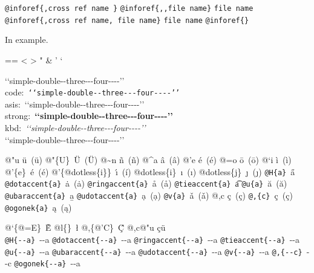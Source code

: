 \documentclass{book}
\makeatletter
\newcommand\Texinfocommandstyletextkbd[1]{{\ttfamily\textsl{#1}}}%
\newenvironment{Texinfopreformatted}{%
  \par\GNUTobeylines\obeyspaces\frenchspacing\parskip=\z@\parindent=\z@}{}
{\catcode`\^^M=13 \gdef\GNUTobeylines{\catcode`\^^M=13 \def^^M{\null\par}}}
\newenvironment{Texinfoindented}{\begin{list}{}{}\item\relax}{\end{list}}
\renewcommand{\_}{\Texinfounderscore\discretionary{}{}{}}
\makeatother
\begin{document}
\texttt{@inforef\{,cross ref name \}} 
\texttt{@inforef\{{,}{,}file name\}} \texttt{file name}
\texttt{@inforef\{,cross ref name,\ file name\}} \texttt{file name}
\texttt{@inforef\{\}} 



In example.
\begin{Texinfoindented}
\begin{Texinfopreformatted}%
\ttfamily 
<
>
"
\&
'
`

{`}{`}simple-double{-}{-}three{-}{-}{-}four{-}{-}{-}-{'}{'}\leavevmode{}\\
code:\ \texttt{{`}{`}simple-double{-}{-}three{-}{-}{-}four{-}{-}{-}-{'}{'}}\ \leavevmode{}\\
asis:\ {`}{`}simple-double{-}{-}three{-}{-}{-}four{-}{-}{-}-{'}{'}\ \leavevmode{}\\
strong:\ \textbf{{`}{`}simple-double{-}{-}three{-}{-}{-}four{-}{-}{-}-{'}{'}}\ \leavevmode{}\\
kbd:\ \Texinfocommandstyletextkbd{{`}{`}simple-double{-}{-}three{-}{-}{-}four{-}{-}{-}-{'}{'}}\ \leavevmode{}\\

`\hbox{}`simple-double-\hbox{}-three{-}{-}{-}four{-}{-}{-}-'\hbox{}'\leavevmode{}\\

%
%
%
%

@"u \"{u}\ (ü)
@"\{U\}\ \"{U}\ (Ü) 
@\~{}n \~{n}\ (ñ)
@\^{}a \^{a}\ (â)
@'e \'{e}\ (é)
@=o \={o}\ (ō)
@`i \`{i}\ (ì)
@'\{e\}\ \'{e}\ (é)
@'\{@dotless\{i\}\}\ \'{\i{}}\ (í)
@dotless\{i\}\ \i{}\ (ı)
@dotless\{j\}\ \j{}\ (ȷ)
\texttt{@H\{a\}}\ \H{a}
\texttt{@dotaccent\{a\}}\ \.{a}\ (ȧ)
\texttt{@ringaccent\{a\}}\ \r{a}\ (å)
\texttt{@tieaccent\{a\}}\ \t{a}
\texttt{@u\{a\}}\ \u{a}\ (ă)
\texttt{@ubaraccent\{a\}}\ \b{a}
\texttt{@udotaccent\{a\}}\ \d{a}\ (ạ)
\texttt{@v\{a\}}\ \v{a}\ (ǎ)
@,c \c{c}\ (ç)
\texttt{@,\{c\}}\ \c{c}\ (ç)
\texttt{@ogonek\{a\}}\ \k{a}\ (ą)

@`\{@=E\}\ \`{\={E}}
@l\{\}\ \l{}
@,\{@'C\}\ \c{\'{C}}
@,c@"u \c{c}\"{u}\ \leavevmode{}\\

\texttt{@H\{{-}{-}a\}}\ \H{{-}{-}a}
\texttt{@dotaccent\{{-}{-}a\}}\ \.{{-}{-}a}
\texttt{@ringaccent\{{-}{-}a\}}\ \r{{-}{-}a}
\texttt{@tieaccent\{{-}{-}a\}}\ \t{{-}{-}a}
\texttt{@u\{{-}{-}a\}}\ \u{{-}{-}a}
\texttt{@ubaraccent\{{-}{-}a\}}\ \b{{-}{-}a}
\texttt{@udotaccent\{{-}{-}a\}}\ \d{{-}{-}a}
\texttt{@v\{{-}{-}a\}}\ \v{{-}{-}a}
\texttt{@,\{{-}{-}c\}}\ \c{{-}{-}c}
\texttt{@ogonek\{{-}{-}a\}}\ \k{{-}{-}a}


\end{Texinfopreformatted}
\end{Texinfoindented}
\end{document}
